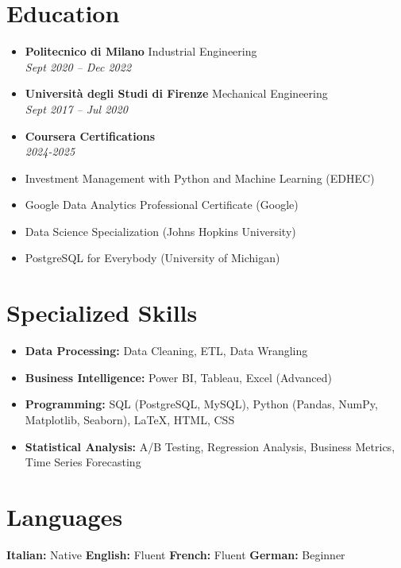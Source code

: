 \documentclass[letterpaper,10.5pt]{article}
\newcommand{\resumeEntry}[4]{
  \item\textbf{#1} \hfill #2\\
  \textit{#3} \hfill \textit{#4}
}
\begin{document}
\section*{Education}
\begin{itemize}[leftmargin=0.2in]
    \resumeEntry{Politecnico di Milano}{Industrial Engineering}{Sept 2020 -- Dec 2022}{}
    \resumeEntry{Università degli Studi di Firenze}{Mechanical Engineering}{Sept 2017 -- Jul 2020}{}
    \resumeEntry{Coursera Certifications}{}{2024-2025}{}
\end{itemize}
\begin{multicols}{2}
    \small
    \begin{itemize}[leftmargin=0.4 in, label={-}]
        \item Investment Management with Python and Machine Learning (EDHEC)
        \item Google Data Analytics Professional Certificate (Google)
    \end{itemize}
    \begin{itemize}[leftmargin=0.3 in, label={-}]
        \item Data Science Specialization (Johns Hopkins University)
        \item PostgreSQL for Everybody (University of Michigan)
    \end{itemize}
\end{multicols}

\section*{Specialized Skills}\vspace{-10pt}
\begin{multicols}{2}
\begin{itemize}[leftmargin=0.2in]
    \item \textbf{Data Processing:} Data Cleaning, ETL, Data Wrangling
    \item \textbf{Business Intelligence:} Power BI, Tableau, Excel (Advanced)
    \item \textbf{Programming:} SQL (PostgreSQL, MySQL), Python (Pandas, NumPy, Matplotlib, Seaborn), LaTeX, HTML, CSS
    \item \textbf{Statistical Analysis:} A/B Testing, Regression Analysis, Business Metrics, Time Series Forecasting
\end{itemize}
\end{multicols}

\section*{Languages}
\textbf{Italian:} Native \hspace{20pt} \textbf{English:} Fluent \hspace{20pt} \textbf{French:} Fluent \hspace{20pt} \textbf{German:} Beginner
\end{document}
